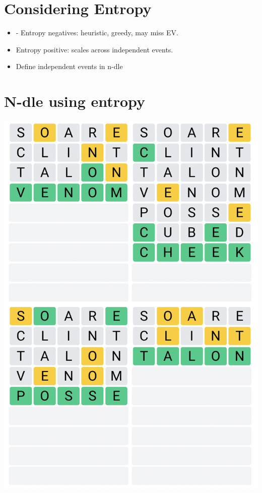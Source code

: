 \documentclass[11pt, oneside]{article}   	%
\begin{document}
\section{Considering Entropy}
\begin{itemize}
\item - Entropy negatives: heuristic, greedy, may miss EV.
\item Entropy positive: scales across independent events.
\item Define independent events in n-dle
\end{itemize}

\section{N-dle using entropy}
\includegraphics[scale=.5]{quordle}
\end{document}
